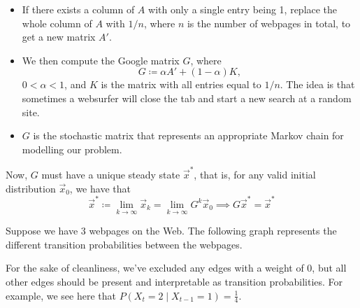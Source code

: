 \begin{itemize}
    \itemsep0em
    \item If there exists a column of $A$ with only a single entry being 1, replace the whole column of $A$ with $1/n$, where $n$ is the number of webpages in total, to get a new matrix $A'$.
    
    \item We then compute the Google matrix $G$, where
    $$G \coloneq \alpha A' + (1 - \alpha)K,$$
    $0 < \alpha < 1$, and $K$ is the matrix with all entries equal to $1/n$. The idea is that sometimes a websurfer will close the tab and start a new search at a random site.
    
    \item $G$ is the stochastic matrix that represents an appropriate Markov chain for modelling our problem. 
\end{itemize}
Now, $G$ must have a unique steady state $\vec{x}^*$, that is, for any valid initial distribution $\vec{x}_0$, we have that
$$\vec{x}^* \coloneq \lim_{k \to \infty} \vec{x}_k = \lim_{k \to \infty} G^k\vec{x}_0 \implies G\vec{x}^* = \vec{x}^*$$

Suppose we have 3 webpages on the Web. The following graph represents the different transition probabilities between the webpages.

\begin{figure}[!h]
    \centering
\end{figure}

For the sake of cleanliness, we've excluded any edges with a weight of 0, but all other edges should be present and interpretable as transition probabilities. For example, we see here that $P(X_{t} = 2 \mid X_{t - 1} = 1) = \frac{1}{4}$.

